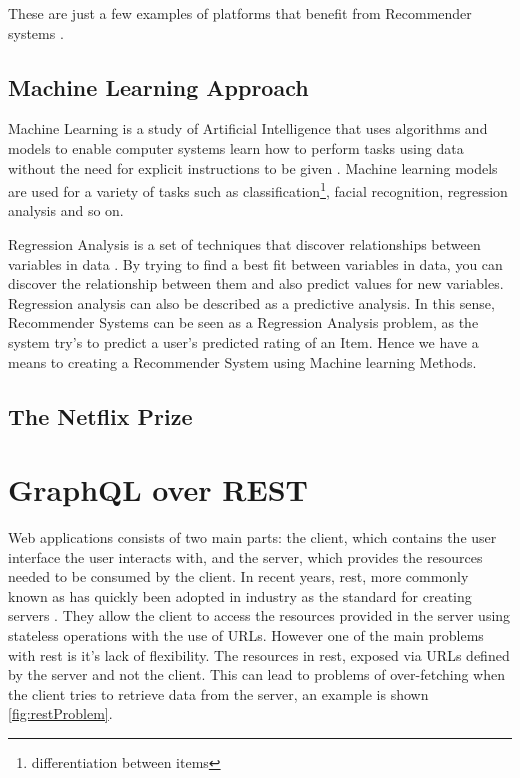 These are just a few examples of platforms that benefit from Recommender systems \cite{polatidis2013recommender}.

\subsection{Machine Learning Approach}
Machine Learning is a study of Artificial Intelligence that uses algorithms and models to enable computer systems learn how to perform tasks using data without the need for explicit instructions to be given \cite{michie1994machine}. Machine learning models are used for a variety of tasks such as classification\footnote{differentiation between items}, facial recognition, regression analysis and so on.

Regression Analysis is a set of techniques that discover relationships between variables in data \cite{chatterjee2015regression}. By trying to find a best fit between variables in data, you can discover the relationship between them and also predict values for new variables. Regression analysis can also be described as a predictive analysis. In this sense, Recommender Systems can be seen as a Regression Analysis problem, as the system try's to predict a user's predicted rating of an Item. Hence we have a means to creating a Recommender System using Machine learning Methods.

\subsection{The Netflix Prize}

\section{GraphQL over REST}
Web applications consists of two main parts: the client, which contains the user interface the user interacts with, and the server, which provides the resources needed to be consumed by the client. In recent years, \acrfull{rest}, more commonly known as  has quickly been adopted in industry as the standard for creating servers \cite{guy2015rest}. They allow the client to access the resources provided in the server using stateless operations with the use of URLs. However one of the main problems with \acrshort{rest} is it's lack of flexibility. The resources in \acrshort{rest}, exposed via URLs defined by the server and not the client. This can lead to problems of over-fetching when the client tries to retrieve data from the server, an example is shown \autoref{fig:restProblem}.

